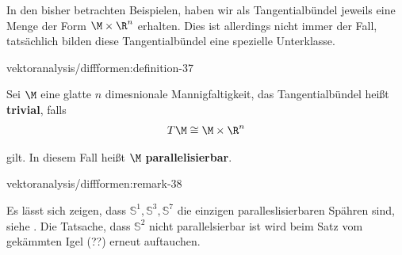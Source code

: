 \documentclass[letterpaper,10pt,english]{jupyterBook}
\begin{document}
\par
In den bisher betrachten Beispielen, haben wir als Tangentialbündel jeweils eine Menge der Form \(\M\times \R^n\) erhalten. Dies ist allerdings nicht immer der Fall, tatsächlich bilden diese Tangentialbündel eine spezielle Unterklasse.
\begin{definition}{}{vektoranalysis/diffformen:definition-37}



\par
Sei \(\M\) eine glatte \(n\) dimesnionale Mannigfaltigkeit, das Tangentialbündel heißt \textbf{trivial}, falls
\begin{align*}
T\M\cong \M\times\R^n
\end{align*}
\par
gilt. In diesem Fall heißt \(\M\) \textbf{parallelisierbar}.
\end{definition}
\begin{remark}{}{vektoranalysis/diffformen:remark-38}



\par
Es lässt sich zeigen, dass \(\mathbb{S}^1, \mathbb{S}^3,\mathbb{S}^7\) die einzigen paralleslisierbaren Spähren sind, siehe \cite{Lee03}. Die Tatsache, dass \(\mathbb{S}^2\) nicht parallelsierbar ist wird beim Satz vom gekämmten Igel (??) erneut auftauchen.
\end{remark}
\end{document}
